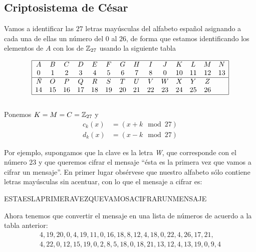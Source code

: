\subsection*{Criptosistema de César}

Vamos a identificar las $27$ letras mayúsculas del alfabeto español asignando a cada una de ellas un número del $0$ al $26$, de forma que estamos identificando los elementos de $A$ con los de $\mathbb{Z}_{27}$ usando la siguiente tabla

\begin{equation}\label{equation:eq1}
    \begin{array}{|cccccccccccccc|}\hline
        A & B & C & D & E & F & G & H & I & J & K  & L  & M  & N \\
        0 & 1 & 2 & 3 & 4 & 5 & 6 & 7 & 8 & 0 & 10 & 11 & 12 & 13 \\ \hline
        \text{\it Ñ} & O  & P  & Q  & R  & S  & T  & U  & V  & W  & X  & Y  & Z & \\
                  14 & 15 & 16 & 17 & 18 & 19 & 20 & 21 & 22 & 23 & 24 & 25 & 26 & \\ \hline
    \end{array}
\end{equation}
\\
Ponemos $K=M=C=\mathbb{Z}_{27}$ y 
\begin{equation*}
    \begin{split}
        c_k(x) &= ( x + k \mod 27 ) \\
        d_k(x) &= ( x - k \mod 27 )
    \end{split}
\end{equation*}

Por ejemplo, supongamos que la clave es la letra \textit{W}, que corresponde con el número $23$ y que queremos cifrar el mensaje ``ésta es la primera vez que vamos a cifrar un mensaje''. En primer lugar obsérvese que nuestro alfabeto sólo contiene letras mayúsculas sin acentuar, con lo que el mensaje a cifrar es:

\begin{center}
    ESTAESLAPRIMERAVEZQUEVAMOSACIFRARUNMENSAJE
\end{center}

Ahora tenemos que convertir el mensaje en una lista de números de acuerdo a la tabla anterior:
\begin{gather*}
    4, 19, 20, 0, 4, 19, 11, 0, 16, 18, 8, 12, 4, 18, 0, 22, 4, 26, 17, 21, \\ 4, 22, 0, 12, 15, 19, 0, 2, 8, 5, 18, 0, 18, 21, 13, 12, 4, 13, 19, 0, 9, 4
\end{gather*}

